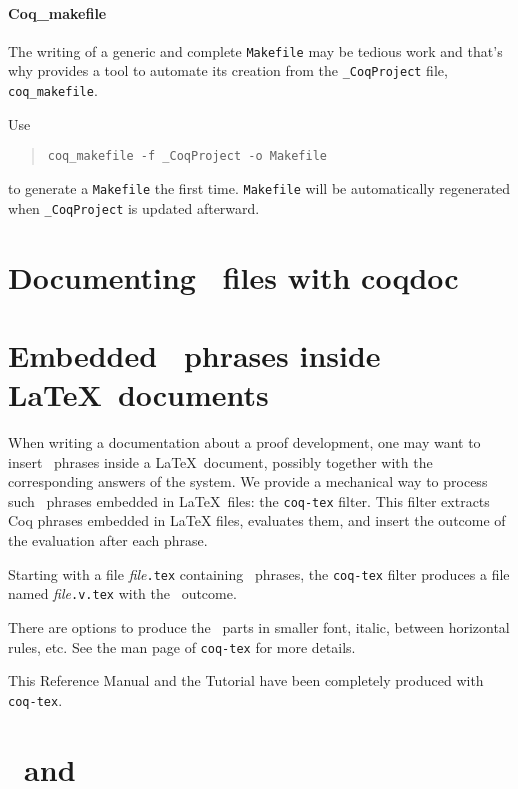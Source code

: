 \paragraph{Coq\_makefile}
The writing of a generic and complete \texttt{Makefile} may be tedious
work and that's why {\Coq} provides a tool to automate its creation
from the \texttt{\_CoqProject} file, \texttt{coq\_makefile}.

Use
\begin{quotation}
\texttt{coq\_makefile -f \_CoqProject -o Makefile}
\end{quotation}
to generate a \texttt{Makefile} the first time. \texttt{Makefile} will be
automatically regenerated when \texttt{\_CoqProject} is updated afterward.

\section[Documenting \Coq\ files with coqdoc]{Documenting \Coq\ files with coqdoc\label{coqdoc}
}



\section[Embedded \Coq\ phrases inside \LaTeX\ documents]{Embedded \Coq\ phrases inside \LaTeX\ documents\label{Latex}
  }

When writing a documentation about a proof development, one may want
to insert \Coq\ phrases inside a \LaTeX\ document, possibly together with
the corresponding answers of the system. We provide a
mechanical way to process such \Coq\ phrases embedded in \LaTeX\ files: the
{\tt coq-tex} filter.  This filter extracts Coq phrases embedded in
LaTeX files, evaluates them, and insert the outcome of the evaluation
after each phrase.

Starting with a file {\em file}{\tt.tex} containing \Coq\ phrases,
the {\tt coq-tex} filter produces a file named {\em file}{\tt.v.tex} with
the \Coq\ outcome.

There are options to produce the \Coq\ parts in smaller font, italic,
between horizontal rules, etc.
See the man page of {\tt coq-tex} for more details.

\medskip{} This Reference Manual and the Tutorial
have been completely produced with {\tt coq-tex}.


\section[\Coq\ and \emacs]{\Coq\ and \emacs\label{Emacs}}

